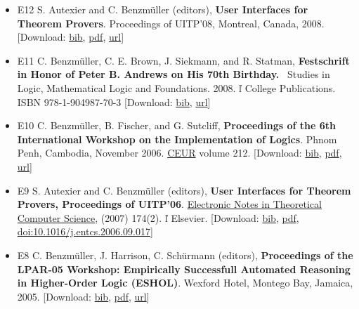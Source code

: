 \documentclass{article}
\newcommand{\tmstrong}[1]{\textbf{#1}}
\newcommand{\tmtextbf}[1]{{\bfseries{#1}}}
\newenvironment{itemizedot}{\begin{itemize} \renewcommand{\labelitemi}{$\bullet$}\renewcommand{\labelitemii}{$\bullet$}\renewcommand{\labelitemiii}{$\bullet$}\renewcommand{\labelitemiv}{$\bullet$}}{\end{itemize}}
\begin{document}
\begin{itemizedot}
  \item [E12] S. Autexier and C. Benzm\"uller (editors), \tmtextbf{User
  Interfaces for Theorem Provers}. Proceedings of UITP'08, Montreal, Canada,
  2008. {\color{grey} [Download: {\small \href{../papers/E12.bib}{bib}},
  {\small \href{../papers/E12.pdf}{pdf}}, {\small
  \href{http://www.sciencedirect.com/science/journal/15710661/226}{url}}]}
  
  \item [E11] C. Benzm\"uller, C. E. Brown, J. Siekmann, and R. Statman,
  {\tmstrong{Festschrift in Honor of Peter B. Andrews on His 70th Birthday.}}
  \ Studies in Logic, Mathematical Logic and Foundations. 2008.  \v{l} 
  College Publications. ISBN 978-1-904987-70-3 {\color{grey} [Download:
  \href{../papers/E11.bib}{bib}, {\small
  \href{http://www.collegepublications.co.uk/logic/mlf/?00010}{url}}]}
  
  \item [E10] C. Benzm\"uller, B. Fischer, and G. Sutcliff,
  \tmtextbf{Proceedings of the 6th International Workshop on the
  Implementation of Logics}. Phnom Penh, Cambodia, November 2006.
  \href{http://ftp.informatik.rwth-aachen.de/Publications/CEUR-WS/Vol-212/}{CEUR}
  volume 212. {\color{grey} [Download: {\small \href{../papers/E10.bib}{bib}},
  {\small \href{../papers/E10.pdf}{pdf}},
  \href{http://ftp.informatik.rwth-aachen.de/Publications/CEUR-WS/Vol-212/}{url}]}
  
  \item [E9] S. Autexier and C. Benzm\"uller (editors), \tmtextbf{User
  Interfaces for Theorem Provers, Proceedings of UITP'06}. \tmtextbf{
  }\href{http://www.elsevier.com/wps/find/journaldescription.cws\_home/681021/description\#description}{Electronic
  Notes in Theoretical Computer Science}, (2007) 174(2).  \v{l}  Elsevier.
  {\color{grey} [Download: {\small \href{../papers/E9.bib}{bib}}, {\small
  \href{../papers/E9.pdf}{pdf}}, {\small
  \href{http://dx.doi.org/10.1016/j.entcs.2006.09.017}{doi:10.1016/j.entcs.2006.09.017}}]}
  
  \item [E8] C. Benzm\"uller, J. Harrison, C. Sch\"urmann (editors),
  \tmtextbf{Proceedings of the LPAR-05 Workshop: Empirically Successfull
  Automated Reasoning in Higher-Order Logic (ESHOL)}. Wexford Hotel, Montego
  Bay, Jamaica, 2005. {\color{grey} [Download: {\small
  \href{../papers/E8.bib}{bib}}, {\small
  \href{../papers/E8.pdf}{pdf}\href{../papers/E8.pdf}{}},
  \href{\href{http://arxiv.org/abs/cs/0601042}{http://arxiv.org/abs/cs/0601042}}{url}]}
  

\end{itemizedot}
\end{document}
